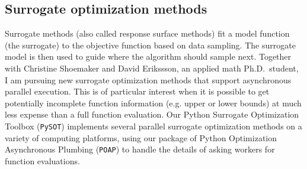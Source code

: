 \documentclass{amsart}
\begin{document}
\subsection*{Surrogate optimization methods}

Surrogate methods (also called response surface methods) fit a model
function (the surrogate) to the objective function based on data
sampling.  The surrogate model is then used to guide where the algorithm
should sample next.  Together with Christine Shoemaker and David
Erikssson, an applied math Ph.D.~student, I am pursuing new surrogate
optimization methods that support asynchronous parallel execution.  This
is of particular interest when it is possible to get potentially
incomplete function information (e.g. upper or lower bounds) at much
less expense than a full function evaluation. Our Python Surrogate
Optimization Toolbox ({\tt PySOT}) implements several parallel surrogate
optimization methods on a variety of computing platforms, using our
package of Python Optimization Asynchronous Plumbing ({\tt POAP}) to
handle the details of asking workers for function evaluations.

\newpage


\end{document}
